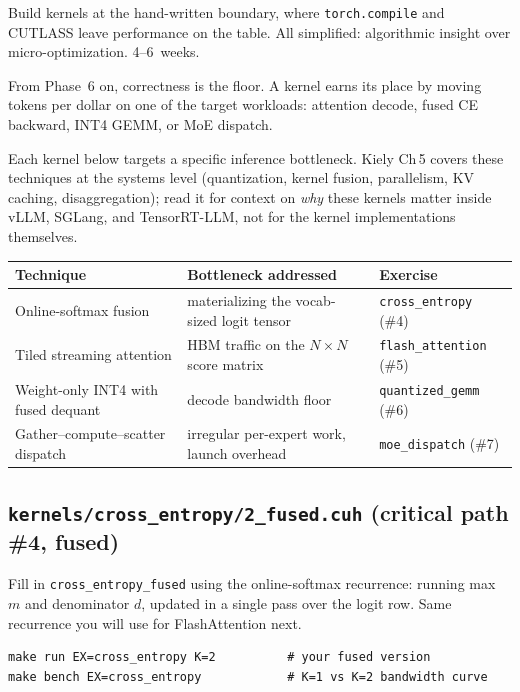 \documentclass[11pt, letterpaper]{article}
\begin{document}
\begin{phasebox}[Goal]
Build kernels at the hand-written boundary, where \texttt{torch.compile} and CUTLASS leave performance on the table. All simplified: algorithmic insight over micro-optimization. 4--6~weeks.
\end{phasebox}

\begin{northstar}
From Phase~6 on, correctness is the floor. A kernel earns its place by moving tokens per dollar on one of the target workloads: attention decode, fused CE backward, INT4 GEMM, or MoE dispatch.
\end{northstar}

Each kernel below targets a specific inference bottleneck. Kiely Ch\,5 covers these techniques at the systems level (quantization, kernel fusion, parallelism, KV caching, disaggregation); read it for context on \emph{why} these kernels matter inside vLLM, SGLang, and TensorRT-LLM, not for the kernel implementations themselves.

\medskip
\begin{tabularx}{\textwidth}{@{}lXl@{}}
\toprule
\textbf{Technique} & \textbf{Bottleneck addressed} & \textbf{Exercise} \\
\midrule
Online-softmax fusion & materializing the vocab-sized logit tensor & \texttt{cross\_entropy} (\#4) \\
Tiled streaming attention & HBM traffic on the $N \times N$ score matrix & \texttt{flash\_attention} (\#5) \\
Weight-only INT4 with fused dequant & decode bandwidth floor & \texttt{quantized\_gemm} (\#6) \\
Gather--compute--scatter dispatch & irregular per-expert work, launch overhead & \texttt{moe\_dispatch} (\#7) \\
\bottomrule
\end{tabularx}

\subsection{\texttt{kernels/cross\_entropy/2\_fused.cuh} (critical path \#4, fused)}

Fill in \texttt{cross\_entropy\_fused} using the online-softmax recurrence: running max $m$ and denominator $d$, updated in a single pass over the logit row. Same recurrence you will use for FlashAttention next.

\begin{verbatim}
make run EX=cross_entropy K=2          # your fused version
make bench EX=cross_entropy            # K=1 vs K=2 bandwidth curve
\end{verbatim}
\end{document}
